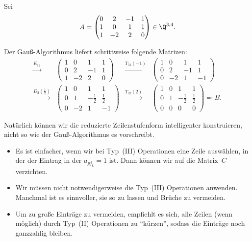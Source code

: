 \documentclass[a4paper]{article}
\begin{document}
\begin{example}
    Sei
    \begin{equation*}
        A = \begin{pmatrix}
            0 & 2  & -1 & 1 \\
            1 & 0  & 1  & 1 \\
            1 & -2 & 2  & 0
        \end{pmatrix} \in \Q^{3, 4}.
    \end{equation*}

    Der Gauß-Algorithmus liefert schrittweise folgende Matrizen:
    \begin{align*}
        \xrightarrow{E_{12}}
         & \begin{pmatrix}
               1 & 0  & 1  & 1 \\
               0 & 2  & -1 & 1 \\
               1 & -2 & 2  & 0
           \end{pmatrix}                     &
        \xrightarrow{T_{31}(-1)}
         & \begin{pmatrix}
               1 & 0  & 1  & 1  \\
               0 & 2  & -1 & 1  \\
               0 & -2 & 1  & -1
           \end{pmatrix}                    \\
        \xrightarrow{D_2(\frac{1}{2})}
         & \begin{pmatrix}
               1 & 0  & 1            & 1           \\
               0 & 1  & -\frac{1}{2} & \frac{1}{2} \\
               0 & -2 & 1            & -1
           \end{pmatrix} &
        \xrightarrow{T_{32}(2)}
         & \begin{pmatrix}
               1 & 0 & 1            & 1           \\
               0 & 1 & -\frac{1}{2} & \frac{1}{2} \\
               0 & 0 & 0            & 0
           \end{pmatrix}
        \eqqcolon B.
    \end{align*}
\end{example}

Natürlich können wir die reduzierte Zeilenstufenform intelligenter konstruieren, nicht so wie der Gauß-Algorithmus es vorschreibt.
\begin{itemize}
    \item Es ist einfacher, wenn wir bei Typ~(III) Operationen eine Zeile auswählen, in der der Eintrag in der $a_{pj_k} = 1$ ist. Dann können wir auf die Matrix~$C$ verzichten.
    \item Wir müssen nicht notwendigerweise die Typ~(III) Operationen anwenden. Manchmal ist es sinnvoller, sie so zu lassen und Brüche zu vermeiden.
    \item Um zu große Einträge zu vermeiden, empfiehlt es sich, alle Zeilen (wenn möglich) durch Typ~(II) Operationen zu "`kürzen"', sodass die Einträge noch ganzzahlig bleiben.
\end{itemize}
\end{document}
